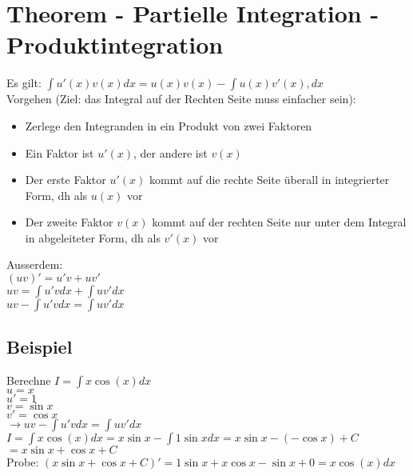 \documentclass[../main.tex]{subfiles}
\begin{document}
\section{Theorem - Partielle Integration - Produktintegration}
Es gilt: $\int u'(x)v(x)dx = u(x)v(x) - \int u(x)v'(x),dx$ \\
Vorgehen (Ziel: das Integral auf der Rechten Seite muss einfacher sein):
\begin{itemize}
    \item Zerlege den Integranden in ein Produkt von zwei Faktoren
    \item Ein Faktor ist $u'(x)$, der andere ist $v(x)$
    \item Der erste Faktor $u'(x)$ kommt auf die rechte Seite 
    überall in integrierter Form, dh als $u(x)$ vor 
    \item Der zweite Faktor $v(x)$ kommt auf der rechten Seite 
    nur unter dem Integral in abgeleiteter Form, dh als $v'(x)$ vor
\end{itemize}

Ausserdem: \\
$(uv)' = u'v + uv'$ \\
$uv = \int u'vdx + \int uv'dx$ \\
$uv - \int u'vdx = \int uv'dx$

\subsection{Beispiel}
Berechne $I=\int x\cos (x)dx$ \\
$u=x$ \\
$u'=1$ \\
$v = \sin x$ \\
$v' = \cos x$ \\
$\longrightarrow uv - \int u'vdx = \int uv'dx$ \\ [7pt]
$I=\int x\cos (x)dx = x\sin x - \int 1 \sin x dx = x\sin x - (-\cos x)+C$ \\
$ = x\sin x + \cos x + C$ \\
Probe: $(x\sin x + \cos x + C)' = 1\sin x + x \cos x - \sin x + 0 = x\cos (x)dx$
\end{document}
